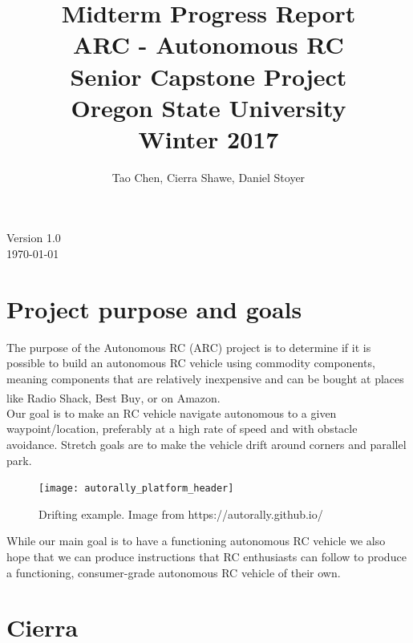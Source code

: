 \documentclass[compsoc,draftclsnofoot,onecolumn,10pt]{IEEEtran}
\date{}
\begin{document}
\begin{titlepage}
\title{
Midterm Progress Report\\
\LARGE
ARC - Autonomous RC\\
Senior Capstone Project\\
Oregon State University\\
Winter 2017
}
\author{Tao Chen, Cierra Shawe, Daniel Stoyer}
\maketitle
\begin{center}
	Version 1.0\\
	\today
\end{center}

\thispagestyle{empty} %
	
\end{titlepage}

\tableofcontents

\newpage

\section{Project purpose and goals} 
The purpose of the Autonomous RC (ARC) project is to determine if it is possible
to build an autonomous RC vehicle using commodity components, meaning components
that are relatively inexpensive and can be bought at places like Radio
Shack\textsuperscript{\textregistered}, Best Buy\textsuperscript{\textregistered}, or on Amazon. \\
Our goal is to make an RC vehicle navigate autonomous to a given
waypoint/location, preferably at a high rate of speed and with obstacle avoidance. Stretch goals are to
make the vehicle drift around corners and parallel park.\\

\begin{figure}[H]
   	\texttt{[image: autorally\_platform\_header]}
    \caption{Drifting example. Image from https://autorally.github.io/}
\end{figure}

While our main goal is to have a functioning autonomous RC vehicle we also hope
that we can produce instructions that RC enthusiasts can follow to produce a
functioning, consumer-grade autonomous RC vehicle of their own.

\section{Cierra}
\end{document}
